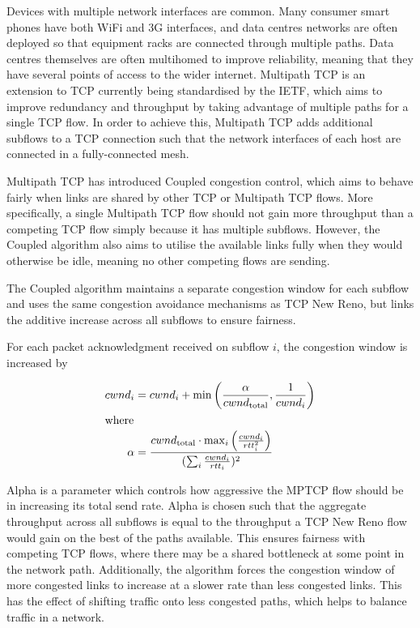 
Devices with multiple network interfaces are common. Many consumer smart phones
have both WiFi and 3G interfaces, and data centres networks are often deployed
so that equipment racks are connected through multiple paths. Data centres
themselves are often multihomed to improve reliability, meaning that they have
several points of access to the wider internet. Multipath TCP is an
extension to TCP currently being standardised by the IETF, which aims to improve
redundancy and throughput by taking advantage of multiple paths for a single TCP
flow. In order to achieve this, Multipath TCP adds additional subflows to a TCP
connection such that the network interfaces of each host are connected in a
fully-connected mesh. %


Multipath TCP has introduced Coupled congestion control, which aims to behave
fairly when links are shared by other TCP or Multipath TCP flows. More
specifically, a single Multipath TCP flow should not gain more throughput than a
competing TCP flow simply because it has multiple subflows. However, the Coupled
algorithm also aims to utilise the available links fully when they would
otherwise be idle, meaning no other competing flows are sending.

The Coupled algorithm maintains a separate congestion window for each subflow
and uses the same congestion avoidance mechanisms as TCP New Reno, but links the
additive increase across all subflows to ensure fairness.

For each packet acknowledgment received on subflow $i$, the congestion window is
increased by


\begin{align*}
  cwnd_i &= cwnd_i +
    \min\left(\frac{\alpha}{cwnd_\text{total}}, \frac{1}{cwnd_i}\right) \\
  \intertext{where}
  \alpha &=
    \frac{cwnd_\text{total} \cdot \max_i\left(\frac{cwnd_i}{rtt_i^2}\right)}
         {(\sum_i \frac{cwnd_i}{rtt_i})^2}
\end{align*}

Alpha is a parameter which controls how aggressive the MPTCP flow should be in
increasing its total send rate. Alpha is chosen such that the aggregate
throughput across all subflows is equal to the throughput a TCP New Reno flow
would gain on the best of the paths available. This ensures fairness with
competing TCP flows, where there may be a shared bottleneck at some point in the
network path. Additionally, the algorithm forces the congestion window of more
congested links to increase at a slower rate than less congested links. This has
the effect of shifting traffic  onto less congested paths, which helps to
balance traffic in a network.

